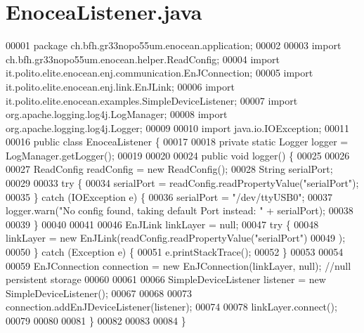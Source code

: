 \section{Enocea\+Listener.\+java}
\label{EnoceaListener_8java_source}

\begin{DoxyCode}
00001 \textcolor{keyword}{package }ch.bfh.gr33nopo55um.enocean.application;
00002 
00003 \textcolor{keyword}{import} ch.bfh.gr33nopo55um.enocean.helper.ReadConfig;
00004 \textcolor{keyword}{import} it.polito.elite.enocean.enj.communication.EnJConnection;
00005 \textcolor{keyword}{import} it.polito.elite.enocean.enj.link.EnJLink;
00006 \textcolor{keyword}{import} it.polito.elite.enocean.examples.SimpleDeviceListener;
00007 \textcolor{keyword}{import} org.apache.logging.log4j.LogManager;
00008 \textcolor{keyword}{import} org.apache.logging.log4j.Logger;
00009 
00010 \textcolor{keyword}{import} java.io.IOException;
00011 
00016 \textcolor{keyword}{public} \textcolor{keyword}{class }EnoceaListener \{
00017 
00018     \textcolor{keyword}{private} \textcolor{keyword}{static} Logger logger = LogManager.getLogger();
00019 
00020 
00024     \textcolor{keyword}{public} \textcolor{keywordtype}{void} logger() \{
00025 
00026 
00027         ReadConfig readConfig = \textcolor{keyword}{new} ReadConfig();
00028         String serialPort;
00029 
00033         \textcolor{keywordflow}{try} \{
00034             serialPort = readConfig.readPropertyValue(\textcolor{stringliteral}{"serialPort"});
00035         \} \textcolor{keywordflow}{catch} (IOException e) \{
00036             serialPort = \textcolor{stringliteral}{"/dev/ttyUSB0"};
00037             logger.warn(\textcolor{stringliteral}{"No config found, taking default Port instead: "} + serialPort);
00038 
00039         \}
00040 
00041 
00046         EnJLink linkLayer = null;
00047         \textcolor{keywordflow}{try} \{
00048             linkLayer = \textcolor{keyword}{new} EnJLink(readConfig.readPropertyValue(\textcolor{stringliteral}{"serialPort"})
00049             );
00050         \} \textcolor{keywordflow}{catch} (Exception e) \{
00051             e.printStackTrace();
00052         \}
00053 
00054 
00059         EnJConnection connection = \textcolor{keyword}{new} EnJConnection(linkLayer, null); \textcolor{comment}{//null persistent storage}
00060 
00061 
00066         SimpleDeviceListener listener = \textcolor{keyword}{new} SimpleDeviceListener();
00067 
00068 
00073         connection.addEnJDeviceListener(listener);
00074 
00078         linkLayer.connect();
00079 
00080 
00081     \}
00082 
00083 
00084 \}
\end{DoxyCode}
